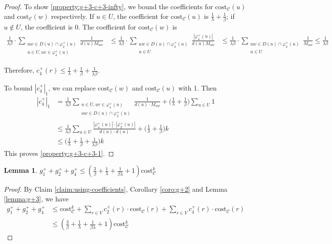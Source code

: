 \documentclass[11pt]{article}
\newcommand{\cost}{\mathrm{cost}}
\newtheorem{lemma}[theorem]{Lemma}
\newcommand{\calC}{{\mathcal{C}}}
\begin{document}
\begin{CJK*}{UTF8}{gbsn}
\begin{proof}
   To show \ref{property:g+3-c+3-infty}, we bound the coefficients for $\cost_\calC(u)$ and $\cost_\calC(w)$ respectively.  If $u \in U$, the coefficient for $\cost_\calC(u)$ is $\frac{1}{\lambda} + \frac{1}{\beta}$; if $u \notin U$, the coefficient is $0$.  The coefficient for $\cost_\calC(w)$ is 
   \begin{align*}
\frac{1}{\lambda\beta} \cdot \sum_{\substack{uw \in D(u) \cap \varphi^+_2(u) \\ u \in U, uv \in \varphi^+_4(u) }} \frac{1}{d(u) M_{uw}} 
    &\leq \frac{1}{\lambda\beta} \cdot \sum_{\substack{uw \in D(u) \cap \varphi^+_2(u) \\ u \in U }} \frac{|\varphi^+_4(u)|}{d(u) M_{uw}} 
    &\leq \frac{1}{\lambda\beta} \cdot \sum_{\substack{uw \in D(u) \cap \varphi^+_2(u) \\ u \in U }} \frac{1}{ M_{uw}} \leq \frac{1}{\lambda\beta}
   \end{align*}
   
 Therefore, $c^+_4(r) \leq \frac{1}{\lambda} + \frac{1}{\beta} + \frac{1}{\lambda\beta}$.

    To bound $|c^+_4|_1$, we can replace $\cost_\calC(w)$ and $\cost_\calC(u)$ with 1. Then 
\begin{align*}
   |c^+_4|_1 &= \frac{1}{\lambda\beta} \sum_{\substack{u \in U, uv \in \varphi^+_4(u) \\ uw \in D(u) \cap \varphi^+_2(u)}} 
 \frac{1}{d(u) \cdot M_{uw}} +  \big(\frac{1}{\lambda} + \frac{1}{\beta} \big) \sum_{u \in U} 1\\
    &\leq \frac{1}{\lambda\beta} \sum_{u \in U} \frac{|\varphi^+_4(u)|\cdot |\varphi^+_2(u)|}{d(u) \cdot d(u)} +  \big(\frac{1}{\lambda} + \frac{1}{\beta} \big) k \\
  & \leq \big( \frac{1}{\lambda} + \frac{1}{\beta} + \frac{1}{\lambda\beta} \big)k
\end{align*}
 This proves \ref{property:g+3-c+3-1}. 
\end{proof}

\begin{lemma}
\label{lemma:g+1+2+3}
$g^+_1 + g^+_2 + g^+_4 \leq (\frac{3}{\beta} + \frac{1}{\lambda} + \frac{1}{\beta\lambda} + 1)\cost^k_{\calC}$
\end{lemma}
\begin{proof}
    By Claim \ref{claim:using-coefficients}, Corollary \ref{coro:g+2} and Lemma \ref{lemma:g+3}, we have 
    \begin{align*}
        g^+_1 + g^+_2 + g^+_4 &\leq \cost^k_{\calC} + \sum_{r \in V} c^+_2(r) \cdot \cost_{\calC}(r) + \sum_{r \in V} c^+_4(r) \cdot \cost_{\calC}(r) \\
        &\leq (\frac{3}{\beta} + \frac{1}{\lambda} + \frac{1}{\beta\lambda} + 1)\cost^k_{\calC}
    \end{align*}
\end{proof}


\end{CJK*}
\end{document}
